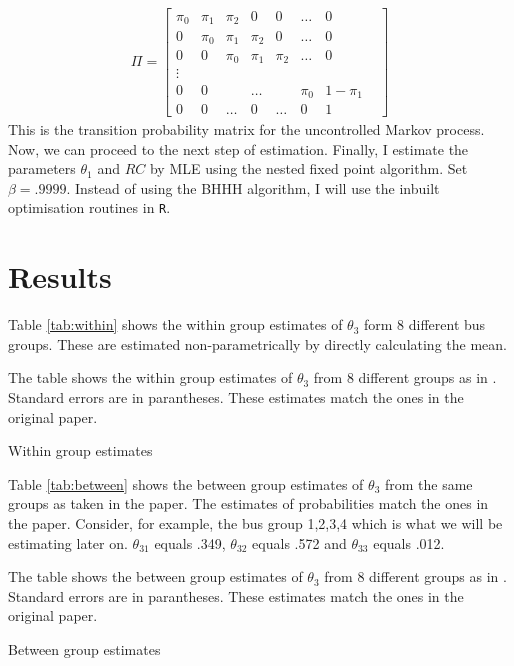 \documentclass[11pt,letterpaper]{article}
\newcommand{\floatintro}[1]{
  
  \vspace*{0.1in}
  
  {\footnotesize

    #1
    
  }
  
  \vspace*{0.1in} } \newcommand{\Hline}{\noindent\rule{18cm}{0.5pt}}
\begin{document}
\begin{align*}
  \Pi = \begin{bmatrix}
    \pi_0 & \pi_1 & \pi_2 & 0 & 0 & \dots & 0\\
    0 & \pi_0 & \pi_1 & \pi_2 & 0 & \dots & 0\\
    0 & 0 & \pi_0 & \pi_1 & \pi_2 & \dots & 0\\
    \vdots \\
    0& 0& &\dots & & \pi_0 & 1-\pi_1&\\
    0 & 0 & \dots & 0 & \dots & 0& 1
  \end{bmatrix}
\end{align*}
This is the transition probability matrix for the uncontrolled Markov
process. Now, we can proceed to the next step of estimation.  Finally,
I estimate the parameters $\theta_1$ and $RC$ by MLE using the nested
fixed point algorithm. Set $\beta=.9999$. Instead of using the BHHH
algorithm, I will use the inbuilt optimisation routines in \texttt{R}.
\section{Results}
Table \ref{tab:within} shows the within group estimates of $\theta_3$
form 8 different bus groups. These are estimated non-parametrically by
directly calculating the mean.

\begin{table}[htbp!]
  \floatintro{The table shows the within group estimates of $\theta_3$
    from 8 different groups as in \citet{rust1987optimal}. Standard
    errors are in parantheses. These estimates match the ones in the
    original paper.}
  \centering
  \resizebox{.9\textwidth}{!}{
    }
  \caption{Within group estimates}
  \label{tab:within}
\end{table}

Table \ref{tab:between} shows the between group estimates of
$\theta_3$ from the same groups as taken in the paper. The estimates
of probabilities match the ones in the paper. Consider, for example,
the bus group 1,2,3,4 which is what we will be estimating later
on. $\theta_{31}$ equals .349, $\theta_{32}$ equals .572 and
$\theta_{33}$ equals .012.
\begin{table}[htbp!]
  \floatintro{The table shows the between group estimates of $\theta_3$
    from 8 different groups as in \citet{rust1987optimal}. Standard
    errors are in parantheses. These estimates match the ones in the
    original paper.}
  \centering
  \resizebox{\textwidth}{!}{
    }
  \caption{Between group estimates}
  \label{tab:between}
\end{table}
\end{document}
